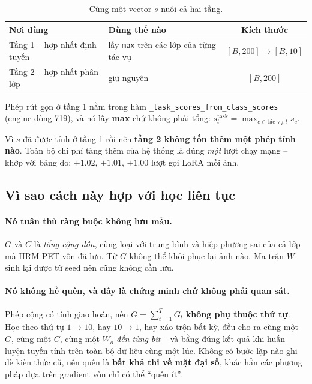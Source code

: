 \documentclass[11pt,a4paper]{article}
\begin{document}
\begin{table}[htbp]
\centering
\caption{Cùng một vector $s$ nuôi cả hai tầng.}
\label{tab:rp-hai-tang}
\begin{tabular}{@{}llc@{}}
\toprule
Nơi dùng & Dùng thế nào & Kích thước \\
\midrule
Tầng 1 -- hợp nhất định tuyến
  & lấy \texttt{max} trên các lớp của từng tác vụ
  & $[B, 200] \rightarrow [B, 10]$ \\
Tầng 2 -- hợp nhất phân lớp
  & giữ nguyên
  & $[B, 200]$ \\
\bottomrule
\end{tabular}
\end{table}

Phép rút gọn ở tầng 1 nằm trong hàm \texttt{\_task\_scores\_from\_class\_scores}
(engine dòng 719), và nó lấy \textbf{max} chứ không phải tổng:
$s^{\mathrm{task}}_t = \max_{c \in \text{tác vụ } t} s_c$.

Vì $s$ đã được tính ở tầng 1 rồi nên \textbf{tầng 2 không tốn thêm một phép tính
nào}. Toàn bộ chi phí tăng thêm của hệ thống là đúng \emph{một} lượt chạy mạng --
khớp với bảng đo: $+1.02$, $+1.01$, $+1.00$ lượt gọi LoRA mỗi ảnh.

\subsection{Vì sao cách này hợp với học liên tục}

\paragraph{Nó tuân thủ ràng buộc không lưu mẫu.}
$G$ và $C$ là \emph{tổng cộng dồn}, cùng loại với trung bình và hiệp phương sai
của cả lớp mà HRM-PET vốn đã lưu. Từ $G$ không thể khôi phục lại ảnh nào. Ma trận
$W$ sinh lại được từ seed nên cũng không cần lưu.

\paragraph{Nó không hề quên, và đây là chứng minh chứ không phải quan sát.}
Phép cộng có tính giao hoán, nên $G = \sum_{t=1}^{T} G_t$ \textbf{không phụ thuộc
thứ tự}. Học theo thứ tự $1 \rightarrow 10$, hay $10 \rightarrow 1$, hay xáo trộn
bất kỳ, đều cho ra cùng một $G$, cùng một $C$, cùng một $W_o$ \emph{đến từng
bit} -- và bằng đúng kết quả khi huấn luyện tuyến tính trên toàn bộ dữ liệu cùng
một lúc. Không có bước lặp nào ghi đè kiến thức cũ, nên quên là \textbf{bất khả
thi về mặt đại số}, khác hẳn các phương pháp dựa trên gradient vốn chỉ có thể
``quên ít''.
\end{document}

